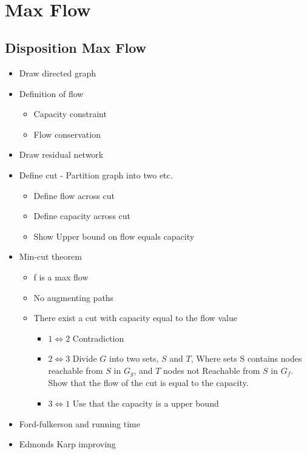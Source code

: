 \documentclass[10pt]{article}
\author{\authorName \\\texttt{\small{\authorEmail}}}
\title{\textsc{\titleName \\ \courseName}}
\begin{document}
\maketitle 

\tableofcontents
\clearpage \newpage
\section{Max Flow} %
\label{sec:max_flow}

\subsection{Disposition Max Flow} %
\label{sub:disposition}

\begin{itemize}
  \item Draw directed graph
  \item Definition of flow
  \begin{itemize}
    \item Capacity constraint
    \item Flow conservation
  \end{itemize}
  \item Draw residual network
  \item Define cut - Partition graph into two etc.
  \begin{itemize}
    \item Define flow across cut
    \item Define capacity across cut
    \item Show Upper bound on flow equals capacity
  \end{itemize}
  \item Min-cut theorem
  \begin{itemize}
    \item f is a max flow  
    \item No augmenting paths
    \item There exist a cut with capacity equal to the flow value
    \begin{itemize}
      \item $1 \Leftrightarrow 2$ Contradiction
      \item $2 \Leftrightarrow 3$ Divide $G$ into two sets, $S$ and $T$, Where sets S contains nodes reachable from $S$ in $G_g$, and $T$ nodes not Reachable from $S$ in $G_f$. Show that the flow of the cut is equal to the capacity.
      \item $3 \Leftrightarrow 1$ Use that the capacity is a upper bound
    \end{itemize}
  \end{itemize}
  \item Ford-fulkerson and running time
  \item Edmonds Karp improving
\end{itemize}
\end{document}
